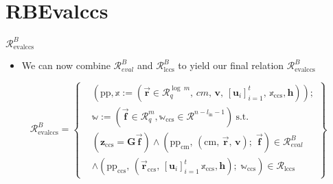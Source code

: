 \section{RBEvalccs}
\begin{frame}
    {$\mathcal{R}^B_{\text{evalccs}}$}
    \begin{itemize}
        \item We can now combine $\mathcal{R}^B_{eval}$ and $\mathcal{R}^B_{\text{lccs}}$ to yield our final relation $\mathcal{R}^B_{\text{evalccs}}$
    \end{itemize}

    \[
        \mathcal{R}^B_{\text{evalccs}} = \left\{
        \begin{aligned}
             & (\text{pp}, \mathbb{x} := ( \overrightarrow{\textbf{r}} \in \mathcal{R}^{\log\ m}_{q},\, cm,\,\textbf{v},\, [\textbf{u}_i]^t_{i=1},\, \mathbb{x}_{\text{ccs}} , \textbf{h}));                                       \\
             & \mathbb{w} := (\overrightarrow{\textbf{f}} \in \mathcal{R}^m_q, \mathbb{w}_{\text{ccs}} \in \mathcal{R}^{n- l_{\text{in}} -1}) \ \text{s.t.}                                                                        \\
             & (\textbf{z}_{\text{ccs}} = \textbf{G}\overrightarrow{\textbf{f}}) \land (\text{pp}_{\text{cm}},\, (\text{cm},\, \overrightarrow{\textbf{r}},\, \textbf{v});\; \overrightarrow{\textbf{f}}) \in \mathcal{R}^B_{eval} \\
             & \land (\text{pp}_\text{ccs},\, (\overrightarrow{\textbf{r}}_{\text{ccs}},\,[\textbf{u}_i]^t_{i=1} \,\mathbb{x}_\text{ccs}, \textbf{h});\;\mathbb{w}_\text{ccs}) \in \mathcal{R}_{\text{lccs}}
        \end{aligned}
        \right\}
    \]
\end{frame}
